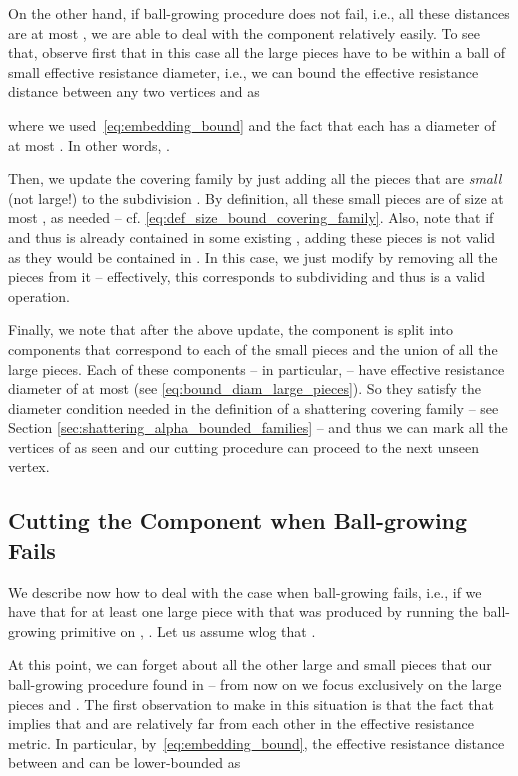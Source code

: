 \documentclass[11pt, letterpaper]{article}
\begin{document}
On the other hand, if ball-growing procedure does not fail, i.e., all these distances  are at most , we are able to deal with the component  relatively easily. To see that, observe first that in this case all the large pieces have to be within a ball of small effective resistance diameter, i.e., we can bound the effective resistance distance  between any two vertices  and  as 

where we used~\eqref{eq:embedding_bound} and the fact that each  has a diameter of at most . In other words, .

Then, we update the covering family  by just adding all the pieces that are {\em small} (not large!) to the subdivision . By definition, all these small pieces are of size at most , as needed -- cf. \eqref{eq:def_size_bound_covering_family}. Also, note that if  and thus  is already contained in some existing , adding these pieces is not valid as they would be contained in . In this case, we just modify  by removing all the pieces from it -- effectively, this corresponds to subdividing  and thus is a valid operation. 

Finally, we note that after the above update, the component  is split into components that correspond to each of the small pieces and the union  of all the large pieces. Each of these components -- in particular,  -- have effective resistance diameter of at most  (see \eqref{eq:bound_diam_large_pieces}). So they satisfy the diameter condition needed in the definition of a shattering covering family -- see Section \ref{sec:shattering_alpha_bounded_families} -- and thus we can mark all the vertices of  as seen and our cutting procedure can proceed to the next unseen vertex. 


\subsection{Cutting the Component  when Ball-growing Fails}\label{sec:ball_growing_fails}

We describe now how to deal with the case when ball-growing fails, i.e., if we have that for at least one large piece  with  that was produced by running the ball-growing primitive on , . Let us assume wlog that . 

At this point, we can forget about all the other large and small pieces that our ball-growing procedure found in  -- from now on we focus exclusively on the large pieces  and . The first observation to make in this situation is that the fact that  implies that  and  are relatively far from each other in the effective resistance metric. In particular, by~\eqref{eq:embedding_bound}, the effective resistance distance  between  and  can be lower-bounded as
\end{document}
